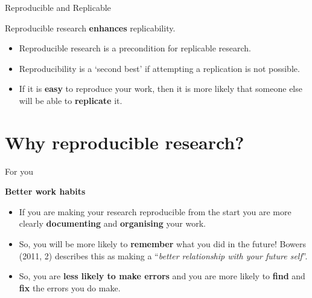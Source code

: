 \documentclass[10pt]{beamer}
\begin{document}
\begin{frame}{Reproducible and Replicable}

    Reproducible research \textbf{enhances} replicability.

    \begin{itemize}
        \item Reproducible research is a precondition for replicable research.

        \vspace{0.5cm}

        \item Reproducibility is a `second best' if attempting a replication is not possible.

        \vspace{0.5cm}

        \item If it is \textbf{easy} to reproduce your work, then it is more likely that someone else will be able to \textbf{replicate} it.
    \end{itemize}

\end{frame}

\section{Why reproducible research?}

\begin{frame}{For you}


    \textbf{Better work habits}

    \begin{itemize}

        \item If you are making your research reproducible from the start you are more clearly \textbf{documenting} and \textbf{organising} your work.

        \vspace{1cm}

        \item So, you will be more likely to \textbf{remember} what you did in the future! Bowers (2011, 2) describes this as making a ``\emph{better relationship with your future self}''.

        \item So, you are \textbf{less likely to make errors} and you are more likely to \textbf{find} and \textbf{fix} the errors you do make.

    \end{itemize}

\end{frame}
\end{document}
